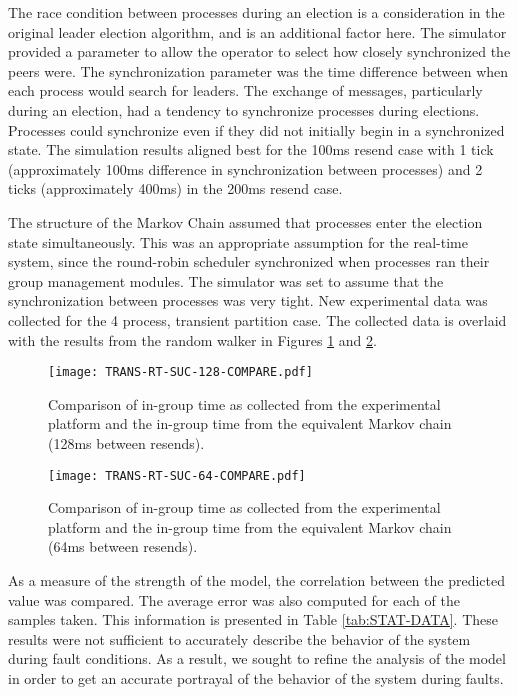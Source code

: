 The race condition between processes during an election is a consideration in the original leader election algorithm, and is an additional factor here.
The simulator provided a parameter to allow the operator to select how closely synchronized the peers were.
The synchronization parameter was the time difference between when each process would search for leaders.
The exchange of messages, particularly during an election, had a tendency to synchronize processes during elections.
Processes could synchronize even if they did not initially begin in a synchronized state. 
The simulation results aligned best for the 100ms resend case with 1 tick (approximately 100ms difference in synchronization between processes) and 2 ticks (approximately 400ms) in the 200ms resend case.


The structure of the Markov Chain assumed that processes enter the election state simultaneously.
This was an appropriate assumption for the real-time system, since the round-robin scheduler synchronized when processes ran their group management modules.
The simulator was set to assume that the synchronization between processes was very tight.
New experimental data was collected for the 4 process, transient partition case.
The collected data is overlaid with the results from the random walker in Figures \ref{fig:COMPARE-SUC-TRANS-RT-128} and \ref{fig:COMPARE-SUC-TRANS-RT-64}.

\begin{figure}[htbp]
    \centering
    \texttt{[image: TRANS-RT-SUC-128-COMPARE.pdf]}
    \caption{Comparison of in-group time as collected from the experimental platform and the in-group time from the equivalent Markov chain (128ms between resends).}
    \label{fig:COMPARE-SUC-TRANS-RT-128}
\end{figure}

\begin{figure}[htbp]
    \centering
    \texttt{[image: TRANS-RT-SUC-64-COMPARE.pdf]}
    \caption{Comparison of in-group time as collected from the experimental platform and the in-group time from the equivalent Markov chain (64ms between resends).}
    \label{fig:COMPARE-SUC-TRANS-RT-64}
\end{figure}

As a measure of the strength of the model, the correlation between the predicted value was compared.
The average error was also computed for each of the samples taken.
This information is presented in Table \ref{tab:STAT-DATA}.
These results were not sufficient to accurately describe the behavior of the system during fault conditions.
As a result, we sought to refine the analysis of the model in order to get an accurate portrayal of the behavior of the system during faults.

